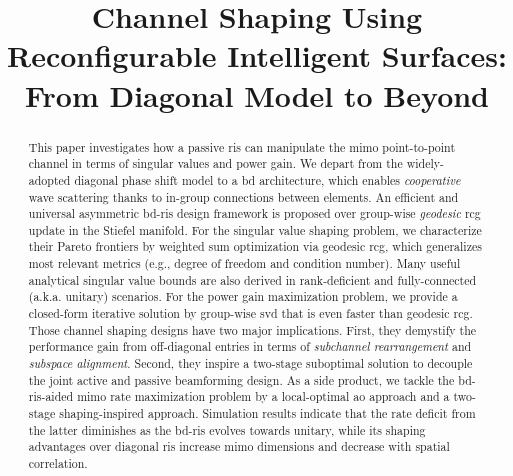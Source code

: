 \documentclass[journal]{IEEEtran}
\begin{document}
\title{Channel Shaping Using Reconfigurable Intelligent Surfaces: From Diagonal Model to Beyond}
\author{
}
\maketitle

\begin{abstract}
	This paper investigates how a passive \gls{ris} can manipulate the \gls{mimo} point-to-point channel in terms of singular values and power gain.
	We depart from the widely-adopted diagonal phase shift model to a \gls{bd} architecture, which enables \emph{cooperative} wave scattering thanks to in-group connections between elements.
	An efficient and universal asymmetric \gls{bd}-\gls{ris} design framework is proposed over group-wise \emph{geodesic} \gls{rcg} update in the Stiefel manifold.
	For the singular value shaping problem, we characterize their Pareto frontiers by weighted sum optimization via geodesic \gls{rcg}, which generalizes most relevant metrics (e.g., degree of freedom and condition number).
	Many useful analytical singular value bounds are also derived in rank-deficient and fully-connected (a.k.a. unitary) scenarios.
	For the power gain maximization problem, we provide a closed-form iterative solution by group-wise \gls{svd} that is even faster than geodesic \gls{rcg}.
	Those channel shaping designs have two major implications.
	First, they demystify the performance gain from off-diagonal entries in terms of \emph{subchannel rearrangement} and \emph{subspace alignment}.
	Second, they inspire a two-stage suboptimal solution to decouple the joint active and passive beamforming design.
	As a side product, we tackle the \gls{bd}-\gls{ris}-aided \gls{mimo} rate maximization problem by a local-optimal \gls{ao} approach and a two-stage shaping-inspired approach.
	Simulation results indicate that the rate deficit from the latter diminishes as the \gls{bd}-\gls{ris} evolves towards unitary, while its shaping advantages over diagonal \gls{ris} increase \gls{mimo} dimensions and decrease with spatial correlation.


\end{abstract}
\end{document}
